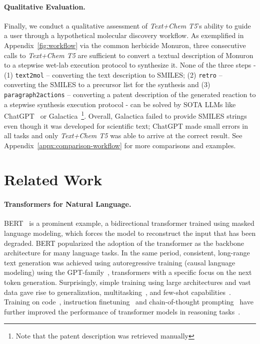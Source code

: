 \documentclass[nohyperref]{article}
\theoremstyle{plain}
\theoremstyle{definition}
\theoremstyle{remark}
\begin{document}
\paragraph{Qualitative Evaluation.}
Finally, we conduct a qualitative assessment of \emph{Text+Chem T5}'s ability to guide a user through a hypothetical molecular discovery workflow.
As exemplified in Appendix~\autoref{fig:workflow} via the common herbicide Monuron, three consecutive calls to \emph{Text+Chem T5} are sufficient to convert a textual description of Monuron to a stepwise wet-lab execution protocol to synthesize it.
None of the three steps -  (1) \texttt{text2mol} -- converting the text description to SMILES; (2) \texttt{retro} -- converting the SMILES to a precursor list for the synthesis and (3) \texttt{paragraph2actions} -- converting a patent description of the generated reaction to a stepwise synthesis execution protocol - can be solved by SOTA LLMs like ChatGPT~\cite{ouyang2022training} or Galactica~\cite{taylor2022galactica}\footnote{Note that the patent description was retrieved manually}. 
Overall, Galactica failed to provide SMILES strings even though it was developed for scientific text; ChatGPT made small errors in all tasks and only \emph{Text+Chem T5} was able to arrive at the correct result. 
See Appendix~\ref{appx:comparison-workflow} for more comparisons and examples. \label{section:related-work}

\section{Related Work}
\paragraph{Transformers for Natural Language.}
BERT~\citep{devlin2018bert} is a prominent example, a bidirectional transformer trained using masked language modeling, which forces the model to reconstruct the input that has been degraded. 
BERT popularized the adoption of the transformer as the backbone architecture for many language tasks.
In the same period, consistent, long-range text generation was achieved using autoregressive training (causal language modeling) using the GPT-family~\citep{radford2018improving}, transformers with a specific focus on the next token generation.
Surprisingly, simple training using large architectures and vast data gave rise to generalization, multitasking~\citep{radford2019language}, and few-shot capabilities~\citep{brown2020language}.
Training on code~\citep{chen2021evaluating}, instruction finetuning~\citep{ouyang2022training, chung2022scaling} and chain-of-thought prompting~\citep{wei2022chain} have further improved the performance of transformer models in reasoning tasks~\citep{fu2022complexity, lewkowycz2022solving, lievin2022can}.
\end{document}
